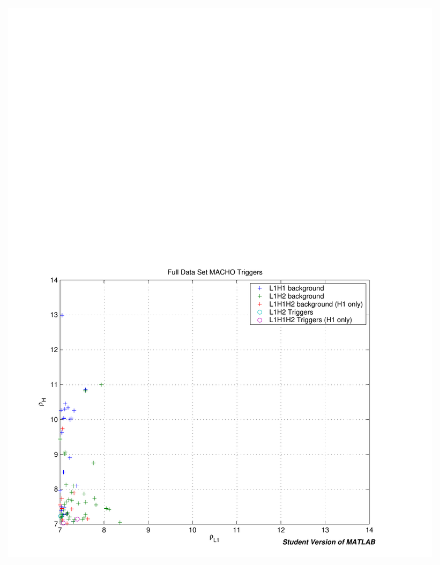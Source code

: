 \begin{figure}[p]
\begin{center}
\includegraphics[width=\textwidth]{analysis/figures/bkg_fgd}\\

\end{center}
\end{figure}
